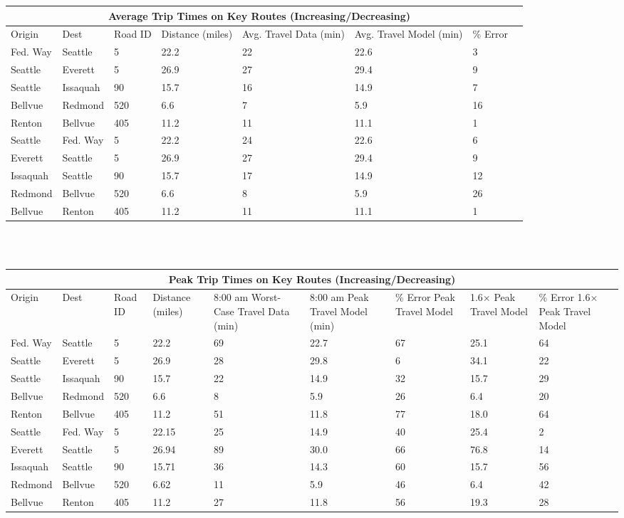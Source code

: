 \noindent \begin{tabular}{
|p{1.5cm}|p{1.5cm}||p{1cm}|p{1.5cm}|p{1.5cm}|p{1.5cm}|p{2cm}|p{1cm}|  }
 \hline
 \multicolumn{7}{|c|}{Average Trip Times on Key Routes (Increasing/Decreasing)} \\
 \hline
 Origin & Dest & Road ID& Distance (miles) & Avg. Travel Data (min) & Avg. Travel Model (min) & \% Error \\
 \hline
 Fed. Way    & Seattle  & 5  & 22.2 & 22 & 22.6 & 3 \\
 Seattle     & Everett  & 5  & 26.9 & 27 & 29.4 & 9 \\
 Seattle     & Issaquah & 90  & 15.7 & 16 & 14.9 & 7 \\
 Bellvue     & Redmond  & 520 & 6.6  & 7  & 5.9 &  16 \\
 Renton      & Bellvue  & 405 & 11.2  & 11 & 11.1 & 1 \\
 Seattle  & Fed. Way  & 5  & 22.2 & 24 & 22.6 & 6 \\
 Everett  & Seattle  & 5   & 26.9 & 27 & 29.4 & 9 \\
 Issaquah & Seattle & 90  & 15.7 & 17 & 14.9 & 12 \\
 Redmond  & Bellvue  & 520 & 6.6  & 8  & 5.9 & 26 \\
 Bellvue  & Renton  & 405 & 11.2  & 11 & 11.1 & 1 \\
 \hline
\end{tabular}
\\
\bigskip
\\
\noindent \begin{tabular}{
|p{1.5cm}|p{1.5cm}||p{0.75cm}|p{1.25cm}|p{2.5cm}|p{2cm}|p{1.5cm}|p{1.5cm}|p{1.5cm}| }
 \hline
 \multicolumn{9}{|c|}{Peak Trip Times on Key Routes (Increasing/Decreasing)} \\
 \hline
 Origin & Dest & Road ID& Distance (miles) & 8:00 am Worst-Case Travel Data (min) & 8:00 am Peak Travel Model (min) & \% Error Peak Travel Model  &  1.6$\times$ Peak Travel Model &  \% Error 1.6$\times$ Peak Travel Model \\
 \hline
 Fed. Way    & Seattle  & 5   & 22.2 & 69 & 22.7 & 67 & 25.1 & 64 \\
 Seattle     & Everett  & 5   & 26.9 & 28 & 29.8 & 6 & 34.1 & 22 \\
 Seattle     & Issaquah & 90  & 15.7 & 22 & 14.9 & 32 & 15.7 & 29 \\
 Bellvue     & Redmond  & 520 & 6.6  & 8  & 5.9 & 26 & 6.4 & 20 \\
 Renton      & Bellvue  & 405 & 11.2  & 51 & 11.8 & 77 & 18.0 & 64 \\
 Seattle  & Fed. Way  & 5   & 22.15 & 25 & 14.9 & 40 & 25.4 & 2 \\
 Everett  & Seattle  & 5   & 26.94 & 89 & 30.0 & 66 & 76.8 & 14 \\
 Issaquah & Seattle & 90  & 15.71 & 36 & 14.3 & 60 & 15.7 & 56 \\
 Redmond  & Bellvue  & 520 & 6.62 & 11 & 5.9 & 46 & 6.4 & 42 \\
 Bellvue  & Renton  & 405 & 11.2  & 27 & 11.8 & 56 & 19.3 & 28 \\
 \hline
\end{tabular}
